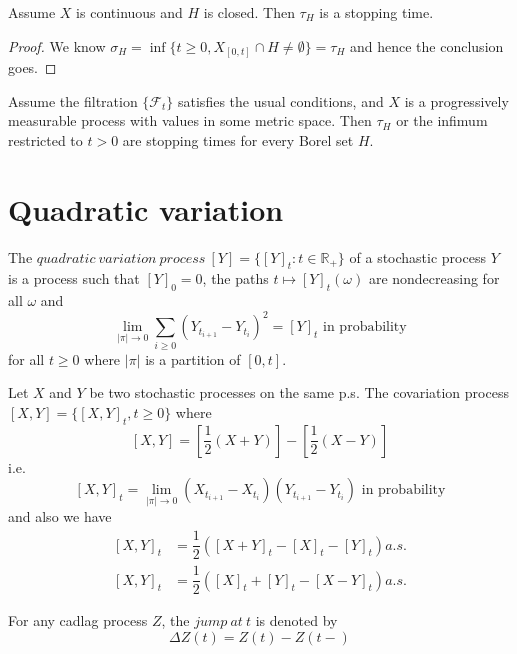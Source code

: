 \documentclass[lang=en, color=blue, ]{elegantbook}
\newcommand{\F}{\mathcal{F}}
\newcommand{\R}{\mathbb{R}}
\begin{document}
\begin{corollary}
Assume $X$ is continuous and $H$ is closed. Then $\tau_H$ is a stopping time.
\end{corollary}
\begin{proof}\par
    We know $\sigma_H = \inf\{t\geq 0, X_{[0,t]}\cap H \neq \emptyset\} = \tau_H$ and hence the conclusion goes.
\end{proof}

\begin{theorem}
Assume the filtration $\{\F_t\}$ satisfies the usual conditions, and $X$ is a progressively measurable process with values in some metric space. Then $\tau_H$ or the infimum restricted to $t>0$ are stopping times for every Borel set $H$.
\end{theorem}
\newpage

\section*{Quadratic variation}

\begin{definition}
    The $quadratic\ variation\ process\ [Y]=\{[Y]_t:t\in\R_+\}$ of a stochastic process $Y$ is a process such that $[Y]_0 = 0$, the paths $t\mapsto [Y]_t(\omega)$ are nondecreasing for all $\omega$ and
    \[\lim_{|\pi|\to 0}\sum\limits_{i\geq 0}(Y_{t_{i+1}}-Y_{t_i})^2 = [Y]_t\text{ in probability}\]
    for all $t\geq 0$ where $|\pi|$ is a partition of $[0,t]$.
\end{definition}

\begin{definition}
Let $X$ and $Y$ be two stochastic processes on the same p.s. The covariation process $[X,Y] = \{[X,Y]_t, t\geq 0\}$ where
\[[X,Y] = [\dfrac{1}{2}(X+Y)]-[\dfrac{1}{2}(X-Y)]\]
i.e. 
\[[X,Y]_t = \lim_{|\pi|\to 0}(X_{t_{i+1}}-X_{t_i})(Y_{t_{i+1}}-Y_{t_i})\text{ in probability}\]
and also we have
\[\begin{aligned}
    [X,Y]_t &= \dfrac{1}{2}([X+Y]_t-[X]_t - [Y]_t) a.s.\\
    [X,Y]_t &= \dfrac{1}{2}([X]_t+[Y]_t - [X-Y]_t) a.s.
\end{aligned}\]
\end{definition}

\begin{definition}
    For any cadlag process $Z$, the $jump\ at\ t$ is denoted by
    \[\Delta Z(t) = Z(t)-Z(t-)\]
\end{definition}
\end{document}
